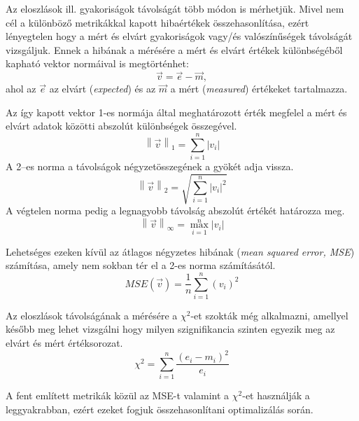 

Az eloszlások ill. gyakoriságok távolságát több módon is mérhetjük.
Mivel nem cél a különböző metrikákkal kapott hibaértékek összehasonlítása, ezért lényegtelen hogy a mért és elvárt gyakoriságok vagy/és valószínűségek távolságát vizsgáljuk.
Ennek a hibának a mérésére a mért és elvárt értékek különbségéből kapható vektor normáival is megtörténhet:
\[
\vec{v} = \vec{e} - \vec{m},
\]
ahol az $\vec{e}$ az elvárt (\textit{expected}) és az $\vec{m}$ a mért (\textit{measured}) értékeket tartalmazza.

Az így kapott vektor 1-es normája által meghatározott érték megfelel a mért és elvárt adatok közötti abszolút különbségek összegével.
\[
\left\lVert\vec{v}\right\rVert_1 = \sum\limits_{i=1}^{n} |v_i|
\]
A 2--es norma a távolságok négyzetösszegének a gyökét adja vissza.
\[
\left\lVert\vec{v}\right\rVert_2 = \sqrt{\sum\limits_{i=1}^{n} |v_i|^2}
\]
A végtelen norma pedig a legnagyobb távolság abszolút értékét határozza meg.
\[
\left\lVert\vec{v}\right\rVert_\infty = \max\limits_{i=1}^{n} |v_i|
\]

Lehetséges ezeken kívül az átlagos négyzetes hibának (\textit{mean squared error, MSE}) számítása, amely nem sokban tér el a 2-es norma számításától.
\[
MSE(\vec{v}) = \frac{1}{n} \sum_{i=1}^{n}(v_i)^2
\]

Az eloszlások távolságának a mérésére a $\chi^2$-et szokták még alkalmazni, amellyel később meg lehet vizsgálni hogy milyen szignifikancia szinten egyezik meg az elvárt és mért értéksorozat.
\[
\chi^2=\sum_{i=1}^{n} \frac{(e_i - m_i)^2}{e_i}
\]

A fent említett metrikák közül az MSE-t valamint a $\chi^2$-et használják a leggyakrabban, ezért ezeket fogjuk összehasonlítani optimalizálás során.

